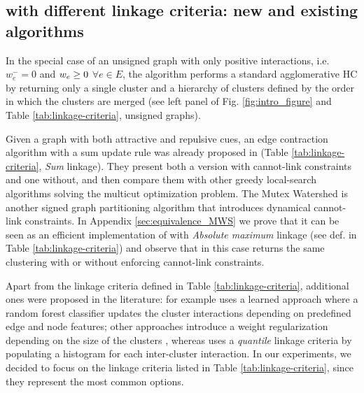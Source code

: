 \subsection{\algname{} with different linkage criteria: new and existing algorithms} \label{sec:alg_update_rules}

In the special case of an unsigned graph with only positive interactions, i.e. $w_e^-=0$ and $w_e \geq 0$ $\forall e\in E$, %
 the algorithm performs a standard agglomerative HC by returning only a single cluster and a hierarchy of clusters defined by the order in which the clusters are merged (see left panel of Fig. \hyperref[fig:intro_figure]{\ref*{fig:intro_figure}} and Table \ref{tab:linkage-criteria}, unsigned graphs).

Given a graph with both attractive and repulsive cues, an edge contraction algorithm with a sum update rule was already proposed in \cite{levinkov2017comparative,keuper2015efficient} (Table \ref{tab:linkage-criteria}, \emph{Sum} linkage). They present both a version with cannot-link constraints and one without, and then compare them with other greedy local-search algorithms solving the multicut optimization problem.
The Mutex Watershed \cite{wolf2018mutex} is another signed graph partitioning algorithm that introduces dynamical cannot-link constraints. In Appendix \ref{sec:equivalence_MWS} we prove that it can be seen as an efficient implementation of \algname{} with \emph{Absolute maximum} linkage (see def. in Table \ref{tab:linkage-criteria}) and observe that in this case \algname{} returns the same clustering with or without enforcing cannot-link constraints.

Apart from the linkage criteria defined in Table \ref{tab:linkage-criteria}, additional ones were proposed in the literature:
\cite{nunez2013machine} for example uses a learned approach where a random forest classifier updates the cluster interactions depending on predefined edge and node features; other approaches introduce a weight regularization depending on the size of the clusters \cite{felzenszwalb2004efficient,kardoostsolving}, whereas 
\cite{funke2018large} uses a \emph{quantile} linkage criteria by populating a histogram for each inter-cluster interaction. In our experiments, we decided to focus on the linkage criteria listed in Table \ref{tab:linkage-criteria}, since they represent the most common options.


